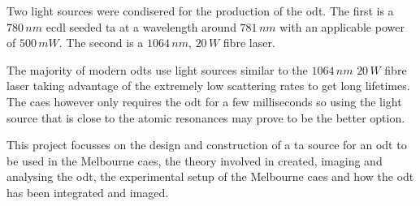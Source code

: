 Two light sources were condisered for the production of the \gls{odt}. The first is a $780\,\unit{nm}$ \gls{ecdl} seeded \gls{ta} at a wavelength around $781\,\unit{nm}$ with an applicable power of $500\,\unit{mW}$. The second is a $1064\,\unit{nm}$, $20\,\unit{W}$ fibre laser.

The majority of modern \glspl{odt} use light sources similar to the $1064\,\unit{nm}$ $20\,\unit{W}$ fibre laser taking advantage of the extremely low scattering rates to get long lifetimes. The \gls{caes} however only requires the \gls{odt} for a few milliseconds so using the light source that is close to the atomic resonances may prove to be the better option.

This project focusses on the design and construction of a \gls{ta} source for an \gls{odt} to be used in the Melbourne \gls{caes}, the theory involved in created, imaging and analysing the \gls{odt}, the experimental setup of the Melbourne \gls{caes} and how the \gls{odt} has been integrated and imaged.




